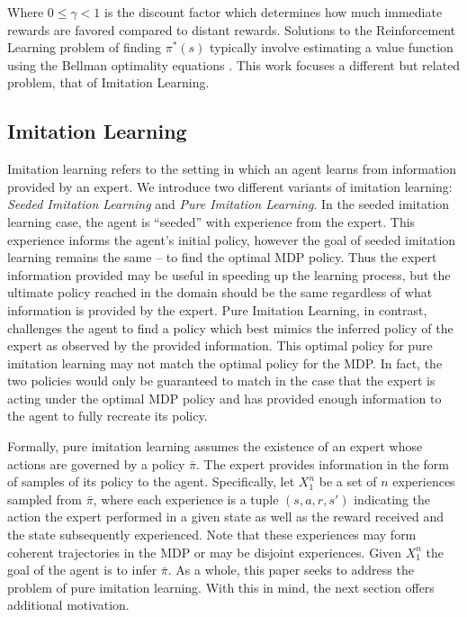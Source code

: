 \documentclass{article} %
\begin{document}
Where $0 \le \gamma < 1$ is the discount factor which determines how much
immediate rewards are favored compared to distant rewards. Solutions to the
Reinforcement Learning problem of finding $\pi^*(s)$ typically involve
estimating a value function using the Bellman optimality equations
\cite{sutton98}. This work focuses a different but related problem, that of
Imitation Learning.

\subsection{Imitation Learning}
Imitation learning refers to the setting in which an agent learns from
information provided by an expert. We introduce two different variants of
imitation learning: \textit{Seeded Imitation Learning} and \textit{Pure
Imitation Learning}. In the seeded imitation learning case, the agent is
``seeded'' with experience from the expert. This experience informs the agent's
initial policy, however the goal of seeded imitation learning remains the same
-- to find the optimal MDP policy. Thus the expert information provided may be
useful in speeding up the learning process, but the ultimate policy reached in
the domain should be the same regardless of what information is provided by the
expert. Pure Imitation Learning, in contrast, challenges the agent to find a
policy which best mimics the inferred policy of the expert as observed by the
provided information. This optimal policy for pure imitation learning may not
match the optimal policy for the MDP. In fact, the two policies would only be
guaranteed to match in the case that the expert is acting under the optimal MDP
policy and has provided enough information to the agent to fully recreate its
policy.

Formally, pure imitation learning assumes the existence of an expert whose
actions are governed by a policy $\bar{\pi}$. The expert provides information
in the form of samples of its policy to the agent. Specifically, let $X_1^n$ be
a set of $n$ experiences sampled from $\bar\pi$, where each experience is a
tuple $(s,a,r,s')$ indicating the action the expert performed in a given state
as well as the reward received and the state subsequently experienced. Note
that these experiences may form coherent trajectories in the MDP or may be
disjoint experiences. Given $X_1^n$ the goal of the agent is to infer
$\bar{\pi}$. As a whole, this paper seeks to address the problem of pure
imitation learning. With this in mind, the next section offers additional
motivation.
\end{document}
